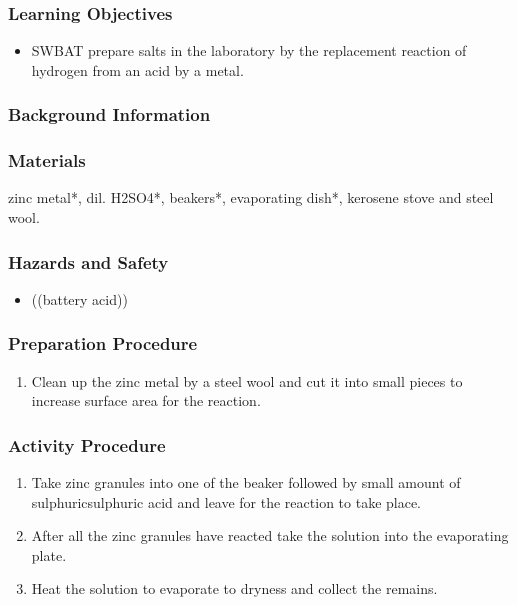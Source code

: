 \subsubsection*{Learning Objectives}
\begin{itemize}
\item{SWBAT prepare salts in the laboratory by the replacement reaction of hydrogen from an acid by a metal.}
\end{itemize}

\subsubsection*{Background Information}


\subsubsection*{Materials}
zinc metal*, dil. H2SO4*, beakers*, evaporating dish*, kerosene stove and steel wool.

\subsubsection*{Hazards and Safety}
\begin{itemize}
\item{((battery acid))}
\end{itemize}

\subsubsection*{Preparation Procedure}
\begin{enumerate}
\item{Clean up the zinc metal by a steel wool and cut it into small pieces to increase surface area for the reaction.}
\end{enumerate}

\subsubsection*{Activity Procedure}
\begin{enumerate}
\item{Take zinc granules into one of the beaker followed by small amount of sulphuricsulphuric acid and leave for the reaction to take place.}
\item{After all the zinc granules have reacted take the solution into the evaporating plate.}
\item{Heat the solution to evaporate to dryness and collect the remains.}
\end{enumerate}

